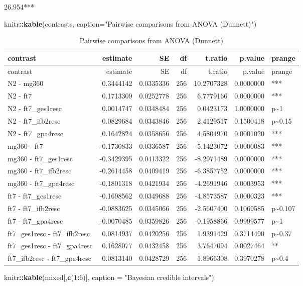 \documentclass[]{article}
\newenvironment{Shaded}{\begin{snugshade}}{\end{snugshade}}
\newcommand{\KeywordTok}[1]{\textcolor[rgb]{0.13,0.29,0.53}{\textbf{#1}}}
\newcommand{\DataTypeTok}[1]{\textcolor[rgb]{0.13,0.29,0.53}{#1}}
\newcommand{\DecValTok}[1]{\textcolor[rgb]{0.00,0.00,0.81}{#1}}
\newcommand{\StringTok}[1]{\textcolor[rgb]{0.31,0.60,0.02}{#1}}
\newcommand{\OperatorTok}[1]{\textcolor[rgb]{0.81,0.36,0.00}{\textbf{#1}}}
\newcommand{\NormalTok}[1]{#1}
\begin{document}
26.954***

\begin{Shaded}
\begin{Highlighting}[]
\NormalTok{knitr}\OperatorTok{::}\KeywordTok{kable}\NormalTok{(contrasts, }\DataTypeTok{caption=}\StringTok{"Pairwise comparisons from ANOVA (Dunnett)"}\NormalTok{)}
\end{Highlighting}
\end{Shaded}

\begin{longtable}[]{@{}lrrrrrl@{}}
\caption{Pairwise comparisons from ANOVA (Dunnett)}\tabularnewline
\toprule
contrast & estimate & SE & df & t.ratio & p.value &
prange\tabularnewline
\midrule
\endfirsthead
\toprule
contrast & estimate & SE & df & t.ratio & p.value &
prange\tabularnewline
\midrule
\endhead
N2 - mg360 & 0.3444142 & 0.0335336 & 256 & 10.2707328 & 0.0000000 &
***\tabularnewline
N2 - ft7 & 0.1713309 & 0.0252778 & 256 & 6.7779166 & 0.0000000 &
***\tabularnewline
N2 - ft7\_ges1resc & 0.0014747 & 0.0348484 & 256 & 0.0423173 & 1.0000000
& p\textasciitilde{}1\tabularnewline
N2 - ft7\_ifb2resc & 0.0829684 & 0.0343846 & 256 & 2.4129517 & 0.1500418
& p\textasciitilde{}0.15\tabularnewline
N2 - ft7\_gpa4resc & 0.1642824 & 0.0358656 & 256 & 4.5804970 & 0.0001020
& ***\tabularnewline
mg360 - ft7 & -0.1730833 & 0.0336587 & 256 & -5.1423072 & 0.0000083 &
***\tabularnewline
mg360 - ft7\_ges1resc & -0.3429395 & 0.0413322 & 256 & -8.2971489 &
0.0000000 & ***\tabularnewline
mg360 - ft7\_ifb2resc & -0.2614458 & 0.0409419 & 256 & -6.3857752 &
0.0000000 & ***\tabularnewline
mg360 - ft7\_gpa4resc & -0.1801318 & 0.0421934 & 256 & -4.2691946 &
0.0003953 & ***\tabularnewline
ft7 - ft7\_ges1resc & -0.1698562 & 0.0349688 & 256 & -4.8573587 &
0.0000323 & ***\tabularnewline
ft7 - ft7\_ifb2resc & -0.0883625 & 0.0345066 & 256 & -2.5607400 &
0.1069585 & p\textasciitilde{}0.107\tabularnewline
ft7 - ft7\_gpa4resc & -0.0070485 & 0.0359826 & 256 & -0.1958866 &
0.9999577 & p\textasciitilde{}1\tabularnewline
ft7\_ges1resc - ft7\_ifb2resc & 0.0814937 & 0.0420256 & 256 & 1.9391429
& 0.3714490 & p\textasciitilde{}0.37\tabularnewline
ft7\_ges1resc - ft7\_gpa4resc & 0.1628077 & 0.0432458 & 256 & 3.7647094
& 0.0027464 & **\tabularnewline
ft7\_ifb2resc - ft7\_gpa4resc & 0.0813140 & 0.0428729 & 256 & 1.8966308
& 0.3970278 & p\textasciitilde{}0.4\tabularnewline
\bottomrule
\end{longtable}

\begin{Shaded}
\begin{Highlighting}[]
\NormalTok{knitr}\OperatorTok{::}\KeywordTok{kable}\NormalTok{(mixed[,}\KeywordTok{c}\NormalTok{(}\DecValTok{1}\OperatorTok{:}\DecValTok{6}\NormalTok{)], }\DataTypeTok{caption =} \StringTok{"Bayesian credible intervals"}\NormalTok{)}
\end{Highlighting}
\end{Shaded}
\end{document}
